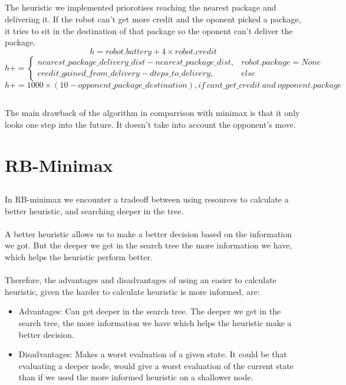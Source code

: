 \documentclass{article}
\begin{document}
\subsection{}
The heuristic we implemented priorotises reaching the nearest package and delivering it. If the robot can't get more credit and the oponent picked a package, it tries to sit in the destination of that package so the oponent can't deliver the package. 
$$h = robot.battery + 4\times robot.credit$$
$$h += \left\{ \begin{array}{ll}
nearest\_package\_delivery\_dist -  nearest\_package\_dist,& robot.package = None\\
credit\_gained\_from\_delivery - dteps\_to\_delivery,& else
\end{array}\right.$$
$$h += 1000 \times (10 - opponent\_package\_destination),  if\ cant\_get\_credit\ and\ opponent.package$$
\subsection{}
The main drawback of the algorithm in comparrison with minimax is that it only looks one step into the future.  It doesn't take into account the opponent's move.
\newpage
\section{RB-Minimax}
\subsection{}
In RB-minimax we encounter a tradeoff between using resources to calculate a better heuristic, and searching deeper in the tree.\\\\
A better heuristic allows us to make a better decision based on the information we got. But the deeper we get in the search tree the more information we have, which helps the heuristic perform better.\\\\
Therefore, the advantages and disadvantages of using an easier to calculate heuristic, given the harder to calculate heuristic is more informed, are:
\begin{itemize}
\item Advantages: Can get deeper in the search tree. The deeper we get in the search tree, the more information we have which helps the heuristic make a better decision.
\item Disadvantages: Makes a worst evaluation of a given state. It could be that evaluating a deeper node, would give a worst evaluation of the current state than if we used the more informed heuristic on a shallower node.
\end{itemize}
\end{document}

